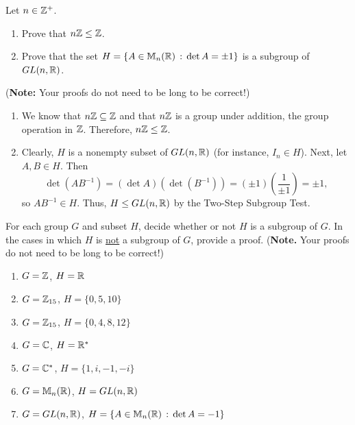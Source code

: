 \begin{exercise}
Let $n\in \mathbb{Z}^+$.
\begin{enumerate}
\item Prove that $n\mathbb{Z} \leq \mathbb{Z}$.
\item Prove that the set $H=\{A\in \mathbb{M}_n(\mathbb{R})\,:\,\det A=\pm 1\}$ is a subgroup of $GL(n,\mathbb{R})$.
\end{enumerate}
(\textbf{Note:} Your proofs do not need to be long to be correct!)
\end{exercise}

\begin{solution}[print=true]
\begin{enumerate}
\item We know that $n\mathbb{Z}\subseteq \mathbb{Z}$ and that $n\mathbb{Z}$ is a group under addition, the group operation in $\mathbb{Z}$.  Therefore, $n\mathbb{Z}\leq \mathbb{Z}$.
\item Clearly, $H$ is a nonempty subset of $GL(n,\mathbb{R})$ (for instance, $I_n\in H$).  Next, let $A,B\in H$.
Then $$\det(AB^{-1})=(\det A)(\det (B^{-1}))=(\pm 1)\left(\frac{1}{\pm 1}\right)=\pm 1,$$ so $AB^{-1}\in H$.  Thus, $H\leq GL(n,\mathbb{R})$ by the Two-Step Subgroup Test.
\end{enumerate}
\end{solution}


\begin{exercise}
For each group $G$ and subset $H$, decide whether or not $H$ is a subgroup of $G$. In the cases in which $H$ is \underline{not} a subgroup of $G$, provide a proof. (\textbf{Note.} Your proofs do not need to be long to be correct!)
\begin{enumerate}
\item $G=\mathbb{Z}$, $H=\mathbb{R}$
\item $G=\mathbb{Z}_{15}$, $H=\{0,5,10\}$
\item $G=\mathbb{Z}_{15}$, $H=\{0,4,8,12\}$
\item $G=\mathbb{C}$, $H=\mathbb{R}^*$
\item $G=\mathbb{C}^*$, $H=\{1,i,-1,-i\}$
\item $G=\mathbb{M}_n(\mathbb{R})$, $H=GL(n,\mathbb{R})$
\item $G=GL(n,\mathbb{R})$, $H=\{A\in \mathbb{M}_n(\mathbb{R})\,:\,\det A = -1\}$
\end{enumerate}
\end{exercise}

